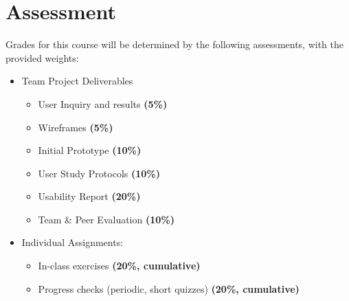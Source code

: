 \documentclass[12pt]{article}
\begin{document}
  \section*{Assessment}
  \noindent
  Grades for this course will be determined by the following assessments, with the provided weights:
  \begin{itemize}
    \item Team Project Deliverables \hfill \\
      \begin{itemize}
        \item User Inquiry and results \textbf{(5\%)}
        \item Wireframes \textbf{(5\%)}
        \item Initial Prototype \textbf{(10\%)}
        \item User Study Protocols \textbf{(10\%)}
        \item Usability Report \textbf{(20\%)}
        \item Team \& Peer Evaluation \textbf{(10\%)}
      \end{itemize}
    \item Individual Assignments: \hfill \\
      \begin{itemize}
        \item In-class exercises \textbf{(20\%, cumulative)}
        \item Progress checks (periodic, short quizzes) \textbf{(20\%, cumulative)}
      \end{itemize}
  \end{itemize}
  
\end{document}
